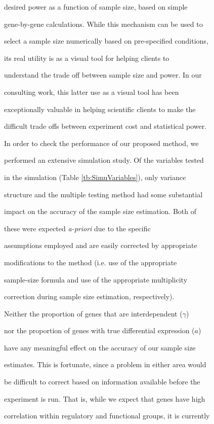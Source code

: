 \documentclass[12pt]{article}
\begin{document}
desired power as a function of sample size, based on simple

gene-by-gene calculations.  While this mechanism can be used to

select a sample size numerically based on pre-specified conditions,

its real utility is as a visual tool for helping clients to

understand the trade off between sample size and power.  In our

consulting work, this latter use as a visual tool has been

exceptionally valuable in helping scientific clients to make the

difficult trade offs between experiment cost and statistical power.



In order to check the performance of our proposed method, we

performed an extensive simulation study. Of the variables tested

in the simulation (Table \ref{tb:SimuVariables}), only variance

structure and the multiple testing method had some substantial

impact on the accuracy of the sample size estimation.  Both of

these were expected \textit{a-priori} due to the specific

assumptions employed and are easily corrected by appropriate

modifications to the method (i.e. use of the appropriate

sample-size formula and use of the appropriate multiplicity

correction during sample size estimation, respectively).



Neither the proportion of genes that are interdependent ($\gamma$)

nor the proportion of genes with true differential expression ($a$)

have any meaningful effect on the accuracy of our sample size

estimates.  This is fortunate, since a problem in either area would

be difficult to correct based on information available before the

experiment is run.  That is, while we expect that genes have high

correlation within regulatory and functional groups, it is currently
\end{document}
